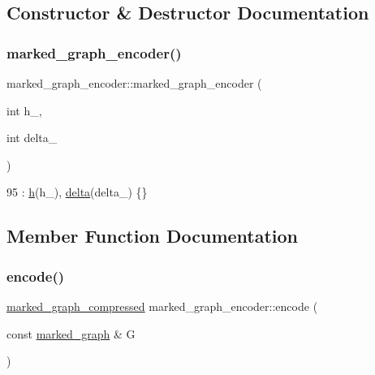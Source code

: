 \subsection{Constructor \& Destructor Documentation}
\mbox{\label{classmarked__graph__encoder_a128d2a38b23ce620c77d00a5eff487ea}} 
\subsubsection{\texorpdfstring{marked\+\_\+graph\+\_\+encoder()}{marked\_graph\_encoder()}}
{\footnotesize\ttfamily marked\+\_\+graph\+\_\+encoder\+::marked\+\_\+graph\+\_\+encoder (\begin{DoxyParamCaption}\item[{int}]{h\+\_\+,  }\item[{int}]{delta\+\_\+ }\end{DoxyParamCaption})\hspace{0.3cm}{\ttfamily [inline]}}


\begin{DoxyCode}
95 : \hyperlink{classmarked__graph__encoder_ae7f8872c57d2d64e4ca6cc47387b9b58}{h}(h\_), \hyperlink{classmarked__graph__encoder_a29dcf42526b12cf7964a556bb1025c9b}{delta}(delta\_) \{\}
\end{DoxyCode}


\subsection{Member Function Documentation}
\mbox{\label{classmarked__graph__encoder_aa7fa19a225dd9b31d6fef9583fab8cf1}} 
\subsubsection{\texorpdfstring{encode()}{encode()}\hspace{0.1cm}{\footnotesize\ttfamily [1/2]}}
{\footnotesize\ttfamily \hyperlink{classmarked__graph__compressed}{marked\+\_\+graph\+\_\+compressed} marked\+\_\+graph\+\_\+encoder\+::encode (\begin{DoxyParamCaption}\item[{const \hyperlink{classmarked__graph}{marked\+\_\+graph} \&}]{G }\end{DoxyParamCaption})}



